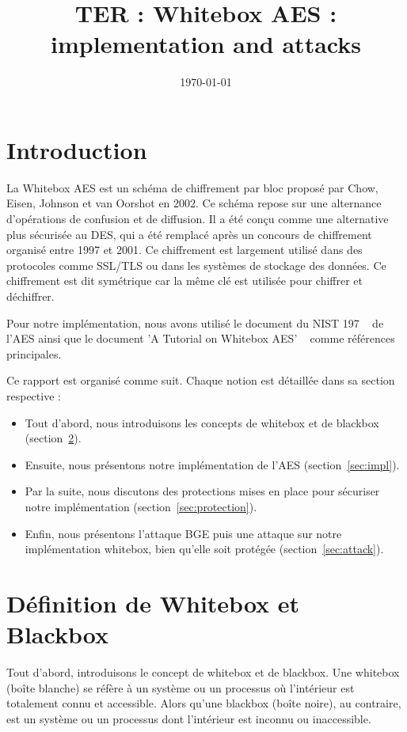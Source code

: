 \documentclass[a4paper, 10pt]{article}
\begin{document}
  \title{TER : Whitebox AES : implementation and attacks}
  \date{\today}
  \maketitle
  \tableofcontents
  \newpage

  \section{Introduction}
  La Whitebox AES est un schéma de chiffrement par bloc proposé par Chow, Eisen, 
  Johnson et van Oorshot en 2002. Ce schéma repose sur une alternance 
  d'opérations de confusion et de diffusion. Il a été conçu comme une alternative 
  plus sécurisée au DES, qui a été remplacé après un concours de chiffrement organisé entre 1997 et 2001.
  Ce chiffrement est largement utilisé dans des protocoles comme SSL/TLS 
  ou dans les systèmes de stockage des données. Ce chiffrement est dit symétrique car la même clé 
  est utilisée pour chiffrer et déchiffrer. 
  
  \indent Pour notre implémentation, nous avons utilisé le document du NIST 197 ~\cite{key} de l'AES ainsi que le document 
  'A Tutorial on Whitebox AES' ~\cite{key1} comme références principales.

  Ce rapport est organisé comme suit. Chaque notion est détaillée dans sa section respective :
  \begin{itemize}
    \item Tout d'abord, nous introduisons les concepts de whitebox et de blackbox (section~\ref{sec:whitebox_blackbox}).
    \item Ensuite, nous présentons notre implémentation de l'AES (section~\ref{sec:impl}).
    \item Par la suite, nous discutons des protections mises en place pour sécuriser notre implémentation (section~\ref{sec:protection}).
    \item Enfin, nous présentons l'attaque BGE puis une attaque sur notre implémentation whitebox, bien qu'elle soit protégée (section~\ref{sec:attack}).
  \end{itemize}  

  \section{Définition de Whitebox et Blackbox}
  \label{sec:whitebox_blackbox}
  \indent Tout d'abord, introduisons le concept de whitebox et de blackbox. Une whitebox (boîte blanche) 
  se réfère à un système ou un processus où l'intérieur est totalement connu et accessible. 
  Alors qu'une blackbox (boîte noire), au contraire, est un système ou un processus dont 
  l'intérieur est inconnu ou inaccessible.
\end{document}
